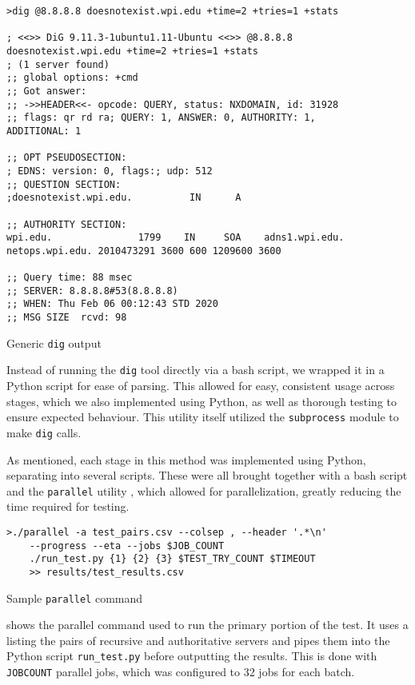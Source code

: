 \begin{code}[H]
    \centering
    \begin{verbatim}
>dig @8.8.8.8 doesnotexist.wpi.edu +time=2 +tries=1 +stats

; <<>> DiG 9.11.3-1ubuntu1.11-Ubuntu <<>> @8.8.8.8 
doesnotexist.wpi.edu +time=2 +tries=1 +stats
; (1 server found)
;; global options: +cmd
;; Got answer:
;; ->>HEADER<<- opcode: QUERY, status: NXDOMAIN, id: 31928
;; flags: qr rd ra; QUERY: 1, ANSWER: 0, AUTHORITY: 1, 
ADDITIONAL: 1

;; OPT PSEUDOSECTION:
; EDNS: version: 0, flags:; udp: 512
;; QUESTION SECTION:
;doesnotexist.wpi.edu.          IN      A

;; AUTHORITY SECTION:
wpi.edu.               1799    IN     SOA    adns1.wpi.edu.
netops.wpi.edu. 2010473291 3600 600 1209600 3600

;; Query time: 88 msec
;; SERVER: 8.8.8.8#53(8.8.8.8)
;; WHEN: Thu Feb 06 00:12:43 STD 2020
;; MSG SIZE  rcvd: 98
    \end{verbatim}
    \caption{Generic \texttt{dig} output}
    \label{fig:generic_dig_output}
\end{code}

Instead of running the \texttt{dig} tool directly via a bash script, we wrapped it in a Python script for ease of parsing. This allowed for easy, consistent usage across stages, which we also implemented using Python, as well as thorough testing to ensure expected behaviour. This utility itself utilized the \texttt{subprocess} module to make \texttt{dig} calls.

As mentioned, each stage in this method was implemented using Python, separating into several scripts. These were all brought together with a bash script and the \texttt{parallel} utility \cite{Tange2011}, which allowed for parallelization, greatly reducing the time required for testing.

\begin{code}[h]
    \centering
    \begin{verbatim}
>./parallel -a test_pairs.csv --colsep , --header '.*\n' 
    --progress --eta --jobs $JOB_COUNT 
    ./run_test.py {1} {2} {3} $TEST_TRY_COUNT $TIMEOUT 
    >> results/test_results.csv
    \end{verbatim}
    \caption{Sample \texttt{parallel} command}
    \label{fig:dns_sample_parallel_command}
\end{code}

 shows the parallel command used to run the primary portion of the test. It uses a \csv listing the pairs of recursive and authoritative \dns servers and pipes them into the Python script \texttt{run\_test.py} before outputting the results. This is done with \texttt{JOBCOUNT} parallel jobs, which was configured to 32 jobs for each batch.


